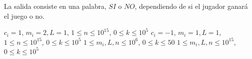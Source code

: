 \documentclass{oci}
\begin{document}
\begin{outputDescription}
La salida consiste en una palabra, $SI$ o $NO$, dependiendo de si el jugador ganará el juego o no.
\end{outputDescription}

\begin{scoreDescription}
   $c_i=1$, $m_i=2, L=1$, $1\leq n \leq 10^{15}$, $0\leq k\leq 10^5$
   $c_i=-1$, $m_i=1, L=1$, $1\leq n \leq 10^{15}$, $0\leq k\leq 10^5$
   $1\leq m_i, L, n\leq 10^{6}$, $0\leq k\leq 50$
   $1\leq m_i, L, n\leq 10^{15}$, $0\leq k\leq 10^5$
\end{scoreDescription}

\begin{sampleDescription}
\end{sampleDescription}
\end{document}

